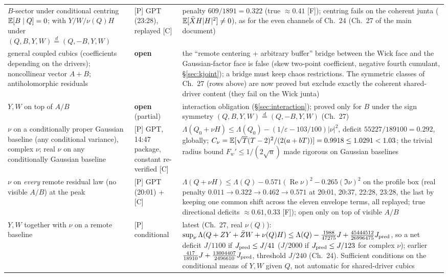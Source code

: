 \documentclass[11pt,a4paper]{article}
\renewcommand{\Re}{\operatorname{Re}}\newcommand{\Var}{\operatorname{Var}}\newcommand{\ph}{\operatorname{phase}}\newcommand{\st}[1]{\textsf{[#1]}}\newcommand{\brkus}{\textunderscore\allowbreak}\usepackage{xstring,adjustbox}\DeclareRobustCommand{\code}[1]{\begingroup\noexpandarg\StrSubstitute{#1}{/}{/\allowbreak}[\brktmp]\texttt{\let\_\brkus\hyphenchar\font=`\-\brktmp}\endgroup}\setlength{\emergencystretch}{3em}
\begin{document}
\begin{center}
\begin{tabular}{p{4.6cm}p{2.2cm}p{8.4cm}}
$B$-sector under conditional centring $\mathbb{E}[B\mid Q]=0$; with $Y/W/\nu(Q)H$ under $(Q,B,Y,W)\overset{d}=(Q,-B,Y,W)$ & \st{P} GPT (23:28), replayed \st{C} & penalty $609/1891=0.322$ (true $\approx0.41$ \st{F}); centring fails on the coherent junta ($\mathbb{E}[\bar XH|H|^2]\ne0$), as for the even channels of Ch.~24 (Ch.~27 of the main document)\\
general coupled cubics (coefficients depending on the drivers); noncollinear vector $A{+}B$; antiholomorphic residuals & \textbf{open} & the ``remote centering + arbitrary buffer'' bridge between the Wick face and the Gaussian-factor face is false (skew two-point coefficient, negative fourth cumulant, \S\ref{sec:kjoint}); a bridge must keep chaos restrictions. The symmetric classes of Ch.~27 (rows above) are now proved but exclude exactly the coherent shared-driver content (they fail on the Wick junta)\\
$Y,W$ on top of $A/B$ & \textbf{open} (partial) & interaction obligation (\S\ref{sec:interaction}); proved only for $B$ under the sign symmetry $(Q,B,Y,W)\overset{d}=(Q,-B,Y,W)$ (Ch.~27)\\
$\nu$ on a conditionally proper Gaussian baseline (any conditional variance), complex $\nu$; real $\nu$ on any conditionally Gaussian baseline & \st{P} GPT, 14:47 package, constant re-verified \st{C} & $\Lambda(Q_0+\nu H)\le\Lambda(Q_0)-(1/\varepsilon-103/100)|\nu|^2$, deficit $55227/189100=0.292$, globally; $C_\nu=\mathbb{E}[\sqrt T(T-2)^2/(2(a+bT))]=0.9918\le1.0291<1.03$; the trivial radius bound $F_w'\le1/(2\sqrt u)$ made rigorous on Gaussian baselines\\
$\nu$ on \emph{every} remote residual law (no visible $A/B$) at the peak & \st{P} GPT (20:01) + \st{C} & $\Lambda(Q+\nu H)\le\Lambda(Q)-0.571(\Re\nu)^2-0.265(\Im\nu)^2$ on the profile box (real penalty $0.011\to0.322\to0.462\to0.571$ at 20:01, 20:37, 22:28, 23:28, the last by keeping one common shift across the eleven envelope terms, all replayed; true directional deficits $\approx0.61,0.33$ \st{F}); open only on top of visible $A/B$\\
$Y,W$ together with $\nu$ on a remote baseline & \st{P} conditional & latest (Ch.~27, real $\nu(Q)$): $\sup_\nu\Lambda(Q+ZY+\bar ZW+\nu(Q)H)\le\Lambda(Q)-\frac{1988}{47275}J+\frac{45444512}{26996475}J_{\rm pred}$, so a net deficit $J/1100$ if $J_{\rm pred}\le J/41$ ($J/2000$ if $J_{\rm pred}\le J/123$ for complex $\nu$); earlier $\frac{417}{18910}J+\frac{13004407}{2496610}J_{\rm pred}$, threshold $J/240$ (Ch.~24). Sufficient conditions on the conditional means of $Y,W$ given $Q$, not automatic for shared-driver cubics\\

\end{tabular}
\end{center}
\end{document}
